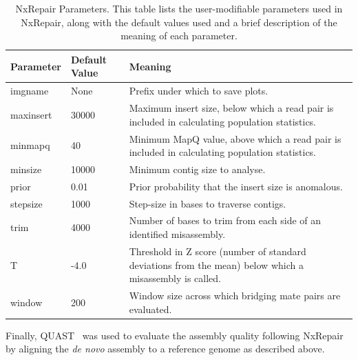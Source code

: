 \begin{table}
\begin{center}
\caption{NxRepair Parameters. This table lists the user-modifiable parameters used in NxRepair, along with the default values used and a brief description of the meaning of each parameter. \label{tab:parameters}}
\begin{tabular}{llp{8cm}}
    \hline
    Parameter & Default Value & Meaning \\ \hline
    imgname & None & Prefix under which to save plots. \\
    maxinsert & 30000 &  Maximum insert size, below which a read pair is included in calculating population statistics.\\
    minmapq & 40 & Minimum MapQ value, above which a read pair is included in calculating population statistics.\\
    minsize & 10000 & Minimum contig size to analyse.\\ 
    prior & 0.01 & Prior probability that the insert size is anomalous.\\
    stepsize & 1000 & Step-size in bases to traverse contigs.\\
    trim & 4000 & Number of bases to trim from each side of an identified misassembly.\\
    T & -4.0 & Threshold in Z score (number of standard deviations from the mean) below which a misassembly is called.\\
    window & 200 & Window size across which bridging mate pairs are evaluated.\\ \hline
\end{tabular}
\end{center}
\end{table}

Finally, QUAST~\cite{Gurevich2013} was used to evaluate the assembly quality following NxRepair by aligning the \textit{de novo} assembly to a reference genome as described above.



